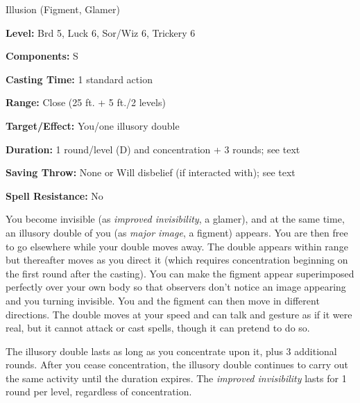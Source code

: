 
Illusion (Figment, Glamer)

\textbf{Level:} Brd 5, Luck 6, Sor/Wiz 6, Trickery 6

\textbf{Components:} S

\textbf{Casting Time:} 1 standard action

\textbf{Range:} Close (25 ft. + 5 ft./2 levels)

\textbf{Target/Effect:} You/one illusory double

\textbf{Duration:} 1 round/level (D) and concentration + 3 rounds; see text

\textbf{Saving Throw:} None or Will disbelief (if interacted with); see text

\textbf{Spell Resistance:} No

You become invisible (as \textit{improved invisibility}, a glamer), and at the 
same time, an illusory double of you (as \textit{major image}, a figment) appears. 
You are then free to go elsewhere while your double moves away. The double appears 
within range but thereafter moves as you direct it (which requires concentration 
beginning on the first round after the casting). You can make the figment appear 
superimposed perfectly over your own body so that observers don't notice an image 
appearing and you turning invisible. You and the figment can then move in different 
directions. The double moves at your speed and can talk and gesture as if it were 
real, but it cannot attack or cast spells, though it can pretend to do so.

The illusory double lasts as long as you concentrate upon it, plus 3 additional 
rounds. After you cease concentration, the illusory double continues to carry out 
the same activity until the duration expires. The \textit{improved invisibility 
}lasts for 1 round per level, regardless of concentration.

